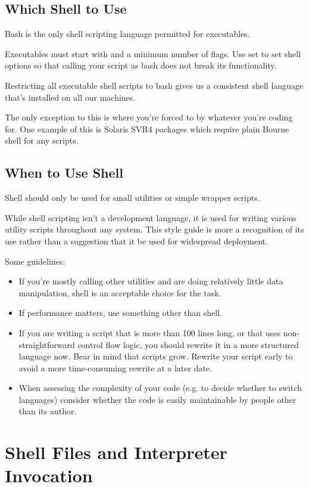 \documentclass{article}
\begin{document}
\subsection{Which Shell to Use}\label{subsec:which_shell}
Bash is the only shell scripting language permitted for executables.

Executables must start with  and a minimum number of flags. Use set to set shell options so that calling your script as bash  does not break its functionality.

Restricting all executable shell scripts to bash gives us a consistent shell language that’s installed on all our machines.

The only exception to this is where you’re forced to by whatever you’re coding for. One example of this is Solaris SVR4 packages which require plain Bourne shell for any scripts.

\subsection{When to Use Shell}\label{subsec:when_shell}
Shell should only be used for small utilities or simple wrapper scripts.

While shell scripting isn’t a development language, it is used for writing various utility scripts throughout any system. This style guide is more a recognition of its use rather than a suggestion that it be used for widespread deployment.

Some guidelines:
\begin{itemize}
    \item If you’re mostly calling other utilities and are doing relatively little data manipulation, shell is an acceptable choice for the task.
    \item If performance matters, use something other than shell.
    \item If you are writing a script that is more than 100 lines long, or that uses non-straightforward control flow logic, you should rewrite it in a more structured language now. Bear in mind that scripts grow. Rewrite your script early to avoid a more time-consuming rewrite at a later date.
    \item When assessing the complexity of your code (e.g. to decide whether to switch languages) consider whether the code is easily maintainable by people other than its author.
\end{itemize}

\section{Shell Files and Interpreter Invocation}\label{sec:shell_files}
\end{document}
